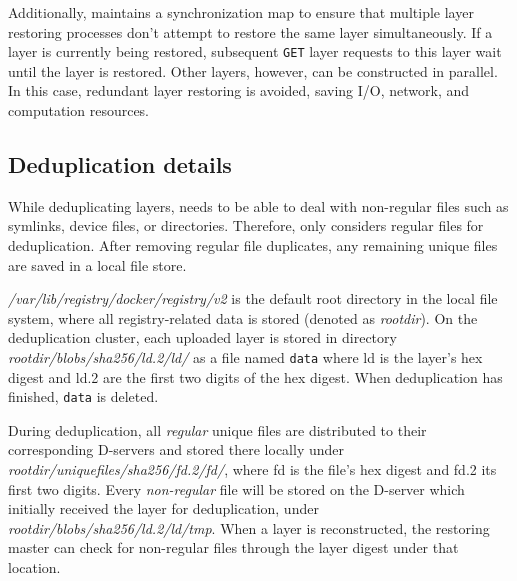 Additionally, \sysname maintains a synchronization map to ensure that multiple layer
restoring processes don't attempt to restore the same layer simultaneously.
%
If a layer is currently being restored, subsequent
\texttt{GET} layer requests to this layer wait until the layer is restored.
%
Other layers, however, can be constructed in parallel.
%
In this case, redundant layer restoring is avoided, saving I/O, network, and
computation resources.
 
 
\subsection{Deduplication details}
\label{sec:deduplication-details}

%
While deduplicating layers, \sysname needs to be able to deal with
non-regular files such as symlinks, device files, or directories.
%
%
Therefore, \sysname only considers regular files for deduplication.
%
After removing regular file duplicates, any remaining unique files are saved in a local file store.
%

\emph{/var/lib/registry/docker/registry/v2} is the default root directory in the local file system, where all
registry-related data is stored (denoted as \emph{rootdir}).
%
On the deduplication cluster,
each uploaded layer is stored in directory \emph{rootdir/blobs/sha256/ld.2/ld/}
as a file named \texttt{data} where ld is the layer's hex
digest and ld.2 are the first two digits of the hex digest.
%
When deduplication has finished, \texttt{data} is deleted.

During deduplication, all \emph{regular} unique files are distributed to their
corresponding D-servers and stored there locally under
\emph{rootdir/uniquefiles/sha256/fd.2/fd/}, where fd is the file's hex
digest and fd.2 its first two digits.
%
Every \emph{non-regular} file will be stored on the D-server which initially
received the layer for deduplication, under \emph{rootdir/blobs/sha256/ld.2/ld/tmp}.
%
When a layer is reconstructed, the restoring master can check for non-regular files through
the layer digest under that location.
%

